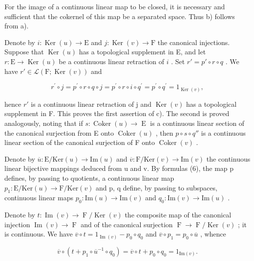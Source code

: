 For the image of a continuous linear map to be closed, it is necessary and sufficient that the cokernel of this map be a separated space. Thus b) follows from a).

Denote by \(i\colon \operatorname{Ker}(u)\to \mathrm{E}\) and \(j\colon \operatorname{Ker}(v)\to \mathrm{F}\) the canonical injections. Suppose that \(\operatorname{Ker}(u)\) has a topological supplement in E, and let \(r\colon \mathrm{E}\to \operatorname{Ker}(u)\) be a continuous linear retraction of \(i\) . Set \(r' = p'\circ r\circ q\) . We have \(r'\in \mathcal{L}(\mathrm{F};\operatorname {Ker}(v))\) and

\[
r ^ {\prime} \circ j = p ^ {\prime} \circ r \circ q \circ j = p ^ {\prime} \circ r \circ i \circ q ^ {\prime} = p ^ {\prime} \circ q ^ {\prime} = 1 _ {\operatorname{Ker} (v)},
\]

hence \(r'\) is a continuous linear retraction of j and \(\operatorname{Ker}(v)\) has a topological supplement in F. This proves the first assertion of c). The second is proved analogously, noting that if \(s: \operatorname{Coker}(u) \to \operatorname{E}\) is a continuous linear section of the canonical surjection from E onto \(\operatorname{Coker}(u)\) , then \(p \circ s \circ q''\) is a continuous linear section of the canonical surjection of F onto \(\operatorname{Coker}(v)\) .

Denote by \(\overline{u}\colon\mathrm{E}/\mathrm{Ker}(u)\to\mathrm{Im}(u)\) and \(\overline{v}\colon\mathrm{F}/\mathrm{Ker}(v)\to\mathrm{Im}(v)\) the continuous linear bijective mappings deduced from u and v. By formulas (6), the map p defines, by passing to quotients, a continuous linear map \(p_{1}\colon\mathrm{E}/\mathrm{Ker}(u)\to\mathrm{F}/\mathrm{Ker}(v)\) and p, q define, by passing to subspaces, continuous linear maps \(p_{0}\colon\mathrm{Im}(u)\to\mathrm{Im}(v)\) and \(q_{0}\colon\mathrm{Im}(v)\to\mathrm{Im}(u)\) .

Denote by \(t \colon \operatorname{Im}(v) \to \operatorname{F} / \operatorname{Ker}(v)\) the composite map of the canonical injection \(\operatorname{Im}(v) \to \operatorname{F}\) and of the canonical surjection \(\operatorname{F} \to \operatorname{F} / \operatorname{Ker}(v)\) ; it is continuous. We have \(\overline{v} \circ t = 1_{\operatorname{Im}(v)} - p_0 \circ q_0\) and \(\overline{v} \circ p_1 = p_0 \circ \overline{u}\) , whence

\[
\overline {{v}} \circ (t + p _ {1} \circ \overline {{u}} ^ {- 1} \circ q _ {0}) = \overline {{v}} \circ t + p _ {0} \circ q _ {0} = 1 _ {\mathrm{Im} (v)}.
\]

